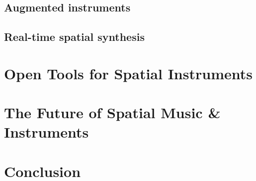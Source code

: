 \subsection{Augmented instruments}
\subsection{Real-time spatial synthesis}

\section{Open Tools for Spatial Instruments}

\section{The Future of Spatial Music \& Instruments}

\section{Conclusion}



